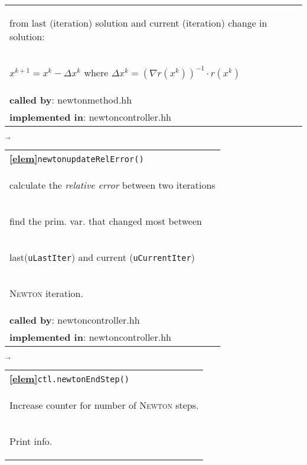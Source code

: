 \begin{landscape}
{\begin{tabular}{|l|}
      \begin{scriptsize}\quad from last (iteration) solution and current (iteration) change in  solution:\end{scriptsize}\\
      \begin{scriptsize} $x^{k+1} = x^k - \Delta x^k$ where $\Delta x^k = (\nabla r(x^k))^{-1} \cdot r(x^k)$\end{scriptsize}\\ 
      \textbf{called by}: newtonmethod.hh\\ 
      \textbf{implemented in}: newtoncontroller.hh\\ 
        \hline 
  \end{tabular}
    {\scriptsize$\overrightarrow{}
    $}
   \begin{tabular}{|l|} 
      \hline 
      \textbf{\textcircled{\ref{elem}}}\verb+newtonupdateRelError()+\\ 
      \begin{scriptsize}calculate the \emph{relative error} between two iterations\end{scriptsize}\\
      \begin{scriptsize}\quad find the prim. var. that changed most between \end{scriptsize}\\
      \begin{scriptsize}\quad last(\verb+uLastIter+) and current (\verb+uCurrentIter+) \end{scriptsize}\\
      \begin{scriptsize}\quad \textsc{Newton} iteration.\end{scriptsize}\\
      \textbf{called by}: newtoncontroller.hh\\ 
      \textbf{implemented in}: newtoncontroller.hh\\ 
	\hline 
  \end{tabular}
\nextline
    {\scriptsize$\overrightarrow{}
    $}
   \begin{tabular}{|l|} 
      \hline 
      \textbf{\textcircled{\ref{elem}}}\verb+ctl.newtonEndStep()+\\ 
      \begin{scriptsize}Increase counter for number of \textsc{Newton} steps. \end{scriptsize}\\
      \begin{scriptsize}Print info. \end{scriptsize}\\

\end{tabular}}
\end{landscape}
